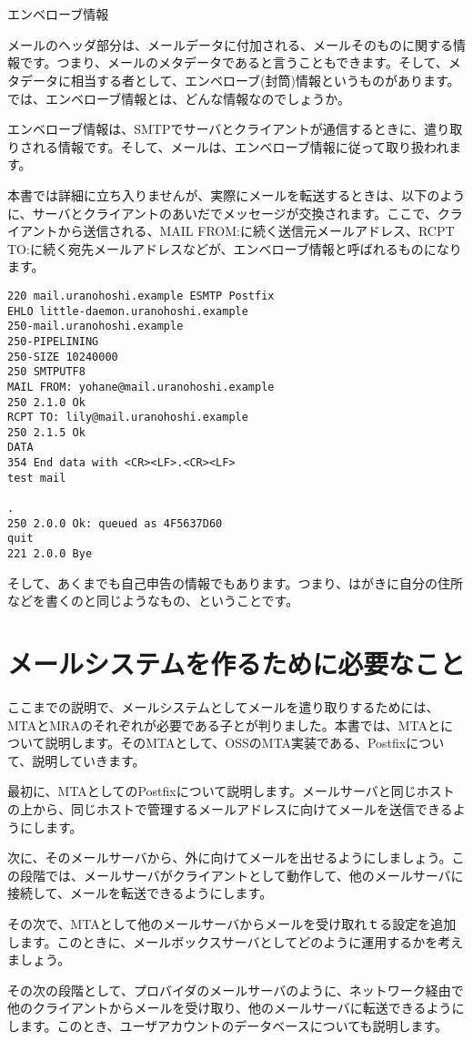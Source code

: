 \section*{}
\begin{itembox}[]{エンベローブ情報}

メールのヘッダ部分は、メールデータに付加される、メールそのものに関する情報です。つまり、メールのメタデータであると言うこともできます。そして、メタデータに相当する者として、エンベローブ(封筒)情報というものがあります。
では、エンベローブ情報とは、どんな情報なのでしょうか。

エンベローブ情報は、SMTPでサーバとクライアントが通信するときに、遣り取りされる情報です。そして、メールは、エンベローブ情報に従って取り扱われます。

本書では詳細に立ち入りませんが、実際にメールを転送するときは、以下のように、サーバとクライアントのあいだでメッセージが交換されます。ここで、クライアントから送信される、MAIL FROM:に続く送信元メールアドレス、RCPT TO:に続く宛先メールアドレスなどが、エンベローブ情報と呼ばれるものになります。

\begin{verbatim}
220 mail.uranohoshi.example ESMTP Postfix
EHLO little-daemon.uranohoshi.example
250-mail.uranohoshi.example
250-PIPELINING
250-SIZE 10240000
250 SMTPUTF8
MAIL FROM: yohane@mail.uranohoshi.example
250 2.1.0 Ok
RCPT TO: lily@mail.uranohoshi.example
250 2.1.5 Ok
DATA
354 End data with <CR><LF>.<CR><LF>
test mail

.
250 2.0.0 Ok: queued as 4F5637D60
quit
221 2.0.0 Bye
\end{verbatim}


そして、あくまでも自己申告の情報でもあります。つまり、はがきに自分の住所などを書くのと同じようなもの、ということです。

\end{itembox}


\section{メールシステムを作るために必要なこと}

ここまでの説明で、メールシステムとしてメールを遣り取りするためには、MTAとMRAのそれぞれが必要である子とが判りました。本書では、MTAとについて説明します。そのMTAとして、OSSのMTA実装である、Postfixについて、説明していきます。

最初に、MTAとしてのPostfixについて説明します。メールサーバと同じホストの上から、同じホストで管理するメールアドレスに向けてメールを送信できるようにします。

次に、そのメールサーバから、外に向けてメールを出せるようにしましょう。この段階では、メールサーバがクライアントとして動作して、他のメールサーバに接続して、メールを転送できるようにします。


その次で、MTAとして他のメールサーバからメールを受け取れｔる設定を追加します。このときに、メールボックスサーバとしてどのように運用するかを考えましょう。

その次の段階として、プロバイダのメールサーバのように、ネットワーク経由で他のクライアントからメールを受け取り、他のメールサーバに転送できるようにします。このとき、ユーザアカウントのデータベースについても説明します。

